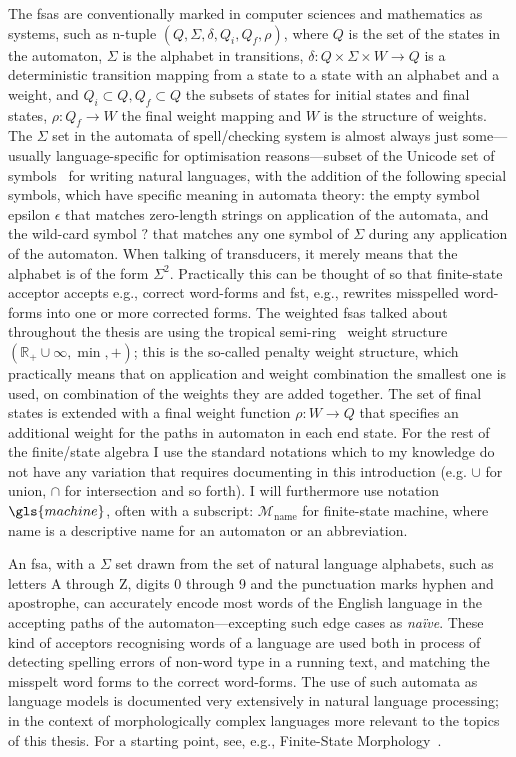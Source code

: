 \documentclass[officiallayout,final]{unihelcompling}
\begin{document}
The \glspl{fsa} are conventionally marked in computer sciences and mathematics
as systems, such as n-tuple $(Q, \Sigma, \delta, Q_i, Q_f, \rho)$, where $Q$ is
the set of the states in the automaton, $\Sigma$ is the alphabet in
transitions, $\delta: Q \times \Sigma \times W \rightarrow Q$ is a
deterministic transition mapping from a state to a state with an alphabet and a
weight, and $Q_i \subset Q, Q_f \subset Q$ the subsets of states for initial
states and final states, $\rho: Q_f \rightarrow W$ the final weight mapping and
$W$ is the structure of weights.  The $\Sigma$ set in the automata of
spell\-/checking system is almost always just some---usually language-specific
for optimisation reasons---subset of the Unicode set of symbols~\citep{unicode}
for writing natural languages, with the addition of the following special
symbols, which have specific meaning in automata theory: the empty symbol
epsilon $\epsilon$ that matches zero-length strings on application of the
automata, and the wild-card symbol $?$ that matches any one symbol of $\Sigma$
during any application of the automaton.  When talking of transducers, it
merely means that the alphabet is of the form $\Sigma^2$. Practically this can
be thought of so that \gls{finite-state acceptor} accepts e.g., correct
word-forms and \gls{fst}, e.g., rewrites misspelled word-forms into one or more
corrected forms.  The weighted \glspl{fsa} talked about throughout the thesis
are using the \gls{tropical semi-ring}~\citep{mohri1997finitestate} weight
structure $(\mathbb{R}_+ \cup \infty, \min, +)$; this is the so-called penalty
weight structure, which practically means that on application and weight
combination the smallest one is used, on combination of the weights they are
added together. The set of final states is extended with a final weight
function $\rho: W \rightarrow Q$ that specifies an additional weight for the
paths in automaton in each end state. For the rest of the finite\-/state
algebra I use the standard notations which to my knowledge do not have any
variation that requires documenting in this introduction (e.g.  $\cup$ for
union, $\cap$ for intersection and so forth). I will furthermore use notation
$\gls{machine}$, often with a subscript: $\mathcal{M}_\mathrm{name}$ for
finite-state machine, where $\mathrm{name}$ is a descriptive name for an
automaton or an abbreviation.

An \gls{fsa}, with a $\Sigma$ set drawn from the set of natural
language alphabets, such as letters A through Z, digits 0 through 9 and the
punctuation marks hyphen and apostrophe, can accurately encode most words of
the English language in the accepting paths of the automaton---excepting such
edge cases as \emph{naïve}. These kind of acceptors recognising words of a language are used both in process
of detecting spelling errors of non-word type in a running text, and matching
the misspelt word forms to the correct word-forms. The use of such automata as
language models is documented very extensively in natural language processing;
in the context of morphologically complex languages more relevant to the topics of
this thesis. For a starting point, see, e.g., Finite-State Morphology~\citep{beesley2003finite,beesley2004morphological}.
\end{document}
